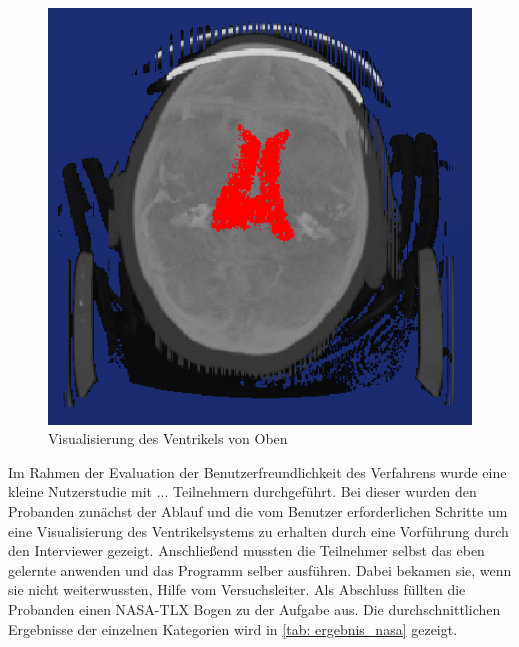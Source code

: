 \begin{figure}[h] 
\centering 
\includegraphics[width=\textwidth/2]{Logos/Oben.PNG}
\caption{Visualisierung des Ventrikels von Oben} 
\label{fig:ventrikel_oben} 
\end{figure}



Im Rahmen der Evaluation der Benutzerfreundlichkeit des Verfahrens wurde eine kleine Nutzerstudie mit ... Teilnehmern durchgeführt. Bei dieser wurden den Probanden zunächst der Ablauf und die vom Benutzer erforderlichen Schritte um eine Visualisierung des Ventrikelsystems zu erhalten durch eine Vorführung durch den Interviewer gezeigt. Anschließend mussten die Teilnehmer selbst das eben gelernte anwenden und das Programm selber ausführen. Dabei bekamen sie, wenn sie nicht weiterwussten, Hilfe vom Versuchsleiter. Als Abschluss füllten die Probanden einen NASA-TLX Bogen zu der Aufgabe aus. Die durchschnittlichen Ergebnisse der einzelnen Kategorien wird in \autoref{tab: ergebnis_nasa} gezeigt.


\begin{table}[h]
\centering
{}
\caption{Durchschnittlichen Ergebnisse des NASA-TLX Bogens}
\label{tab:ergebnis_nasa}
\end{table}


